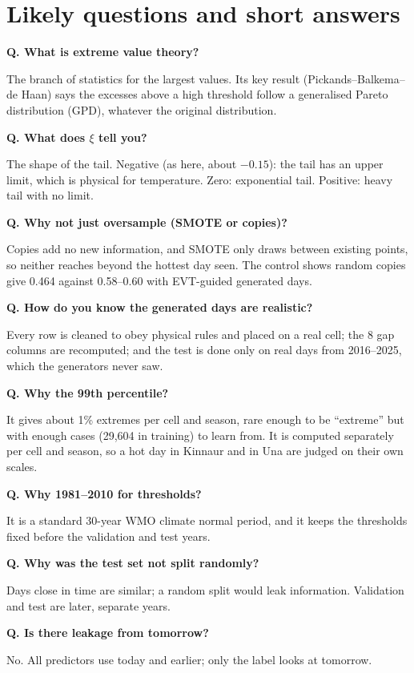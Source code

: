 \chapter{Likely questions and short answers}
\label{ch:questions}

\newcommand{\qa}[2]{\par\medskip\noindent\textbf{Q. #1}\par\noindent #2\par}

\qa{What is extreme value theory?}{The branch of statistics for the largest values. Its key result
(Pickands--Balkema--de Haan) says the excesses above a high threshold follow a generalised Pareto distribution
(GPD), whatever the original distribution.}

\qa{What does $\xi$ tell you?}{The shape of the tail. Negative (as here, about $-0.15$): the tail has an upper limit,
which is physical for temperature. Zero: exponential tail. Positive: heavy tail with no limit.}

\qa{Why not just oversample (SMOTE or copies)?}{Copies add no new information, and SMOTE only draws between existing
points, so neither reaches beyond the hottest day seen. The control shows random copies give 0.464 against 0.58--0.60
with EVT-guided generated days.}

\qa{How do you know the generated days are realistic?}{Every row is cleaned to obey physical rules and placed on a real
cell; the 8 gap columns are recomputed; and the test is done only on real days from 2016--2025, which the generators
never saw.}

\qa{Why the 99th percentile?}{It gives about 1\% extremes per cell and season, rare enough to be ``extreme'' but with
enough cases (29,604 in training) to learn from. It is computed separately per cell and season, so a hot day in Kinnaur
and in Una are judged on their own scales.}

\qa{Why 1981--2010 for thresholds?}{It is a standard 30-year WMO climate normal period, and it keeps the thresholds
fixed before the validation and test years.}

\qa{Why was the test set not split randomly?}{Days close in time are similar; a random split would leak information.
Validation and test are later, separate years.}

\qa{Is there leakage from tomorrow?}{No. All predictors use today and earlier; only the label looks at tomorrow.}

